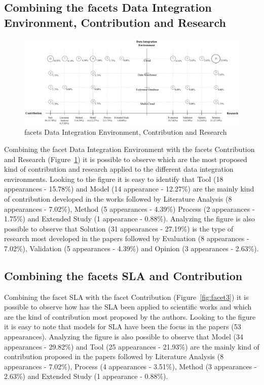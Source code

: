 \subsection{Combining the facets Data Integration Environment, Contribution and Research}

\begin{figure}[h]
\centering
\includegraphics[scale=0.45]{figs/bubble-charts/DI-Environment-Contribution-Research.pdf}
\caption{facets Data Integration Environment, Contribution and Research}\label{fig:facet2}
\end{figure}

Combining the facet Data Integration Environment with the facets Contribution and Research 
(Figure~\ref{fig:facet2}) it is possible to observe which are the most proposed kind of
contribution and research applied to the different data integration environments.  
Looking to the figure it is easy to identify that Tool (18 appearances - 15.78\%) and 
Model (14 appearance - 12.27\%) are the mainly kind of contribution developed in the works 
followed by Literature Analysis (8 appearances - 7.02\%), Method (5 appearances - 4.39\%) 
Process (2 appearances - 1.75\%) and Extended Study (1 appearance - 0.88\%).
Analyzing the figure is also possible to observe that Solution (31 appearances - 27.19\%) is 
the type of research most developed in the papers 
followed by Evaluation (8 appearances - 7.02\%), Validation (5 appearances - 4.39\%) and
Opinion (3 appearances - 2.63\%).

\subsection{Combining the facets SLA and Contribution}

Combining the facet SLA with the facet Contribution (Figure~\ref{fig:facet3}) it is possible 
to observe how has the SLA been applied to scientific works and which are the kind of contribution 
most proposed by the authors.
Looking to the figure it is easy to note that models for SLA have been the focus in the papers 
(53 appearances).
Analyzing the figure is also possible to observe that Model (34 appearances - 29.82\%) and 
Tool (25 appearances - 21.93\%) are the mainly kind of contribution proposed in the papers 
followed by Literature Analysis (8 appearances - 7.02\%), Process (4 appearances - 3.51\%), 
Method (3 appearances - 2.63\%) and Extended Study (1 appearance - 0.88\%).

